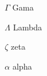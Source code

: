 
\begin{simbolos}
  \item[$ \Gamma $] Gama
  \item[$ \Lambda $] Lambda
  \item[$ \zeta $] zeta
  \item[$ \alpha $] alpha
\end{simbolos}